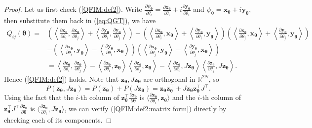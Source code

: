 \documentclass{amsart}
\theoremstyle{plain}
\theoremstyle{definition}
\theoremstyle{remark}
\newcommand{\RR}{\mathbb{R}}
\begin{document}
\begin{proof}
    Let us first check (\ref{QFIM:def2}). Write $\frac{\partial\psi_{\bm\theta}}{\partial\theta_i}=\frac{\partial\bm{x}_{\bm\theta}}{\partial\theta_i}+i\frac{\partial\bm{y}_{\bm\theta}}{\partial\theta_i}$ and $\psi_{\bm\theta}=\bm{x}_{\bm\theta}+i\bm{y}_{\bm\theta}$, then substitute them back in (\ref{eq:QGT}), we have
    \begin{align*}
        Q_{ij}(\bm\theta)=&\left(\left\langle\frac{\partial\bm{x}_{\bm\theta}}{\partial\theta_i},\frac{\partial\bm{x}_{\bm\theta}}{\partial\theta_j}\right\rangle+\left\langle\frac{\partial\bm{y}_{\bm\theta}}{\partial\theta_i},\frac{\partial\bm{y}_{\bm\theta}}{\partial\theta_j}\right\rangle\right)-\left(\left\langle\frac{\partial\bm{x}_{\bm\theta}}{\partial\theta_i},\bm{x}_{\bm\theta}\right\rangle+\left\langle\frac{\partial\bm{y}_{\bm\theta}}{\partial\theta_i},\bm{y}_{\bm\theta}\right\rangle\right)\left(\left\langle\frac{\partial\bm{x}_{\bm\theta}}{\partial\theta_j},\bm{x}_{\bm\theta}\right\rangle+\left\langle\frac{\partial\bm{y}_{\bm\theta}}{\partial\theta_j},\bm{y}_{\bm\theta}\right\rangle\right)\\
        &-\left(\left\langle\frac{\partial\bm{x}_{\bm\theta}}{\partial\theta_i},\bm{y}_{\bm\theta}\right\rangle-\left\langle\frac{\partial\bm{y}_{\bm\theta}}{\partial\theta_i},\bm{x}_{\bm\theta}\right\rangle\right)\left(\left\langle\frac{\partial\bm{x}_{\bm\theta}}{\partial\theta_j},\bm{y}_{\bm\theta}\right\rangle-\left\langle\frac{\partial\bm{y}_{\bm\theta}}{\partial\theta_j},\bm{x}_{\bm\theta}\right\rangle\right)\\
        &=\left\langle\frac{\partial \bm{z}_{\bm\theta}}{\partial\theta_i},\frac{\partial \bm{z}_{\bm\theta}}{\partial\theta_j}\right\rangle-\left\langle\frac{\partial \bm{z}_{\bm\theta}}{\partial\theta_i},\bm{z}_{\bm\theta}\right\rangle\left\langle\frac{\partial \bm{z}_{\bm\theta}}{\partial\theta_j},\bm{z}_{\bm\theta}\right\rangle-\left\langle\frac{\partial \bm{z}_{\bm\theta}}{\partial\theta_i},J\bm{z}_{\bm\theta}\right\rangle\left\langle\frac{\partial \bm{z}_{\bm\theta}}{\partial\theta_j},J\bm{z}_{\bm\theta}\right\rangle.
    \end{align*}
    Hence (\ref{QFIM:def2}) holds. Note that $\bm{z}_{\bm\theta},J\bm{z}_{\bm\theta}$ are orthogonal in $\RR^{2N}$, so \[P(\bm{z}_{\bm\theta},J\bm{z}_{\bm\theta})=P(\bm{z}_{\bm\theta})+P(J\bm{z}_{\bm\theta})=\bm{z}_{\bm\theta}\bm{z}_{\bm\theta}^\top+J\bm{z}_{\bm\theta}\bm{z}_{\bm\theta}^\top J^\top.\]
    Using the fact that the $i$-th column of $\bm{z}_{\bm\theta}^\top\frac{\partial \bm{z}_{\bm\theta}}{\partial\bm\theta}$ is $\langle\frac{\partial \bm{z}_{\bm\theta}}{\partial\theta_i},\bm{z}_{\bm\theta}\rangle$ and the $i$-th column of $\bm{z}_{\bm\theta}^\top J^\top\frac{\partial \bm{z}_{\bm\theta}}{\partial\bm\theta}$ is $\langle\frac{\partial \bm{z}_{\bm\theta}}{\partial\theta_i},J\bm{z}_{\bm\theta}\rangle$, we can verify (\ref{QFIM:def2:matrix form}) directly by checking each of its components.
\end{proof}
\end{document}
